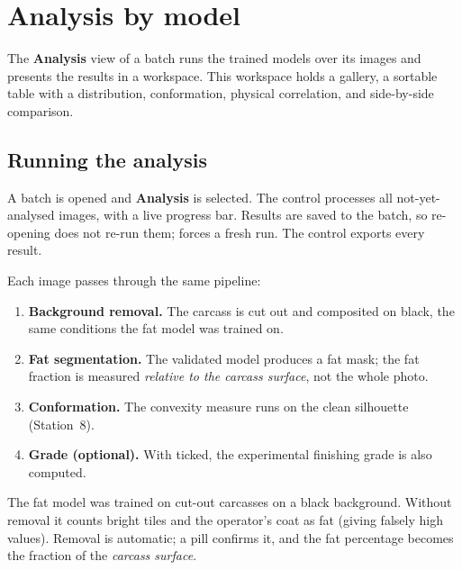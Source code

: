 \chapter{Analysis by model}


\vspace{4pt}
The \textbf{Analysis} view of a batch runs the trained models over its images and
presents the results in a workspace. This workspace holds a gallery, a sortable
table with a distribution, conformation, physical correlation, and side-by-side
comparison.

\section{Running the analysis}

A batch is opened and \textbf{Analysis} is selected. The 
control processes all not-yet-analysed images, with a live progress bar. Results
are saved to the batch, so re-opening does not re-run them; 
forces a fresh run. The  control exports every result.

Each image passes through the same pipeline:

\begin{enumerate}[leftmargin=1.4em,itemsep=3pt]
  \item \textbf{Background removal.} The carcass is cut out and composited on
        black, the same conditions the fat model was trained on.
  \item \textbf{Fat segmentation.} The validated model produces a fat mask; the
        fat fraction is measured \emph{relative to the carcass surface}, not the
        whole photo.
  \item \textbf{Conformation.} The convexity measure runs on the clean silhouette
        (Station~8).
  \item \textbf{Grade (optional).} With 
        ticked, the experimental finishing grade is also computed.
\end{enumerate}

\begin{caution}[title=Why background removal matters]
The fat model was trained on cut-out carcasses on a black background. Without
removal it counts bright tiles and the operator's coat as fat (giving falsely
high values). Removal is automatic; a  pill confirms it,
and the fat percentage becomes the fraction of the \emph{carcass surface}.
\end{caution}

